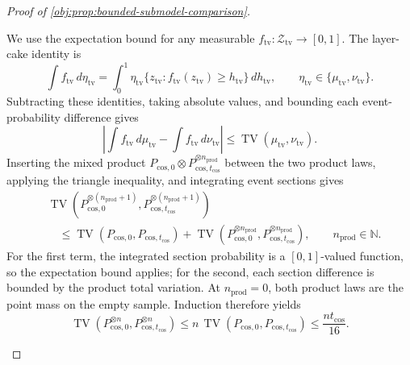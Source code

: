 \begin{proof}[Proof of \cref{obj:prop:bounded-submodel-comparison}]
\begin{enumerate}
We use the expectation bound for any measurable
\(f_{\mathrm{tv}}:\mathcal Z_{\mathrm{tv}}\to[0,1]\). The layer-cake identity is
\[
\int f_{\mathrm{tv}}\,d\eta_{\mathrm{tv}}
=
\int_0^1
\eta_{\mathrm{tv}}
\{z_{\mathrm{tv}}:f_{\mathrm{tv}}(z_{\mathrm{tv}})\ge h_{\mathrm{tv}}\}
\,dh_{\mathrm{tv}},
\qquad
\eta_{\mathrm{tv}}\in\{\mu_{\mathrm{tv}},\nu_{\mathrm{tv}}\}.
\]
Subtracting these identities, taking absolute values, and bounding each event-probability difference gives
\[
\left|
\int f_{\mathrm{tv}}\,d\mu_{\mathrm{tv}}
-\int f_{\mathrm{tv}}\,d\nu_{\mathrm{tv}}
\right|
\le\operatorname{TV}(\mu_{\mathrm{tv}},\nu_{\mathrm{tv}}).
\]
Inserting the mixed product
\(P_{\mathrm{cos},0}\otimes
P_{\mathrm{cos},t_{\mathrm{cos}}}^{\otimes n_{\mathrm{prod}}}\)
between the two product laws, applying the triangle inequality, and integrating event sections gives
\[
\begin{split}
&\operatorname{TV}
\left(
P_{\mathrm{cos},0}^{\otimes(n_{\mathrm{prod}}+1)},
P_{\mathrm{cos},t_{\mathrm{cos}}}^{\otimes(n_{\mathrm{prod}}+1)}
\right)\\
&\quad\le
\operatorname{TV}(P_{\mathrm{cos},0},P_{\mathrm{cos},t_{\mathrm{cos}}})
+
\operatorname{TV}
\left(
P_{\mathrm{cos},0}^{\otimes n_{\mathrm{prod}}},
P_{\mathrm{cos},t_{\mathrm{cos}}}^{\otimes n_{\mathrm{prod}}}
\right),
\qquad n_{\mathrm{prod}}\in\mathbb N.
\end{split}
\]
For the first term, the integrated section probability is a \([0,1]\)-valued function, so the expectation bound applies; for the second, each section difference is bounded by the product total variation. At \(n_{\mathrm{prod}}=0\), both product laws are the point mass on the empty sample. Induction therefore yields
\[
\operatorname{TV}
\left(
P_{\mathrm{cos},0}^{\otimes n},
P_{\mathrm{cos},t_{\mathrm{cos}}}^{\otimes n}
\right)
\le
n\,\operatorname{TV}
(P_{\mathrm{cos},0},P_{\mathrm{cos},t_{\mathrm{cos}}})
\le\frac{nt_{\mathrm{cos}}}{16}.
\]


\end{enumerate}
\end{proof}
